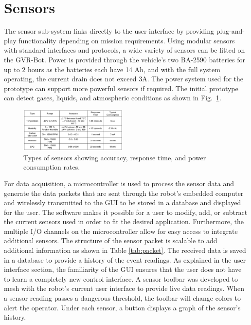 \section{Sensors}\label{sec:sensors}

The sensor sub-system links directly to the user interface by providing plug-and-play functionality depending on mission requirements. Using modular sensors with standard interfaces and protocols, a wide variety of sensors can be fitted on the GVR-Bot. Power is provided through the vehicle's two BA-2590 batteries for up to 2 hours as the batteries each have 14 Ah, and with the full system operating, the current drain does not exceed 3A. The power system used for the prototype can support more powerful sensors if required. The initial prototype can detect gases, liquids, and atmospheric conditions as shown in Fig.~\ref{fig:params}.

\begin{figure}[b]
	\centering
	\includegraphics[width=0.48\textwidth]{./pictures/sensor_params.png}
	\caption{Types of sensors showing accuracy, response time, and power consumption rates.}
	\label{fig:params}
\end{figure}

For data acquisition, a microcontroller is used to process the sensor data and generate the data packets that are sent through the robot's embedded computer and wirelessly transmitted to the GUI to be stored in a database and displayed for the user. The software makes it possible for a user to modify, add, or subtract the current sensors used in order to fit the desired application. Furthermore, the multiple I/O channels on the microcontroller allow for easy access to integrate additional sensors. The structure of the sensor packet is scalable to add additional information as shown in Table \ref{tab:packet}. The received data is saved in a database to provide a history of the event readings. As explained in the user interface section, the familiarity of the GUI ensures that the user does not have to learn a completely new control interface. A sensor toolbar was developed to mesh with the robot's current user interface to provide live data readings. When a sensor reading passes a dangerous threshold, the toolbar will change colors to alert the operator. Under each sensor, a button displays a graph of the sensor's history.

